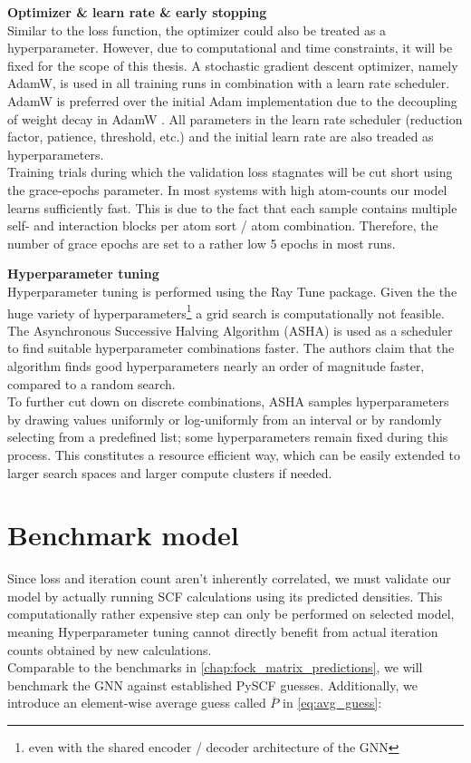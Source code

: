 \textbf{Optimizer \& learn rate \& early stopping}\\
Similar to the loss function, the optimizer could also be treated as a hyperparameter. However, due to computational and time constraints, it will be fixed for the scope of this thesis. A stochastic gradient descent optimizer, namely AdamW, is used in all training runs in combination with a learn rate scheduler. AdamW is preferred over the initial Adam implementation due to the decoupling of weight decay in AdamW \parencite{ref:adamW}. All parameters in the learn rate scheduler (reduction factor, patience, threshold, etc.) and the initial learn rate are also treaded as hyperparameters. \\
Training trials during which the validation loss stagnates will be cut short using the grace-epochs parameter. In most systems with high atom-counts our model learns sufficiently fast. This is due to the fact that each sample contains multiple self- and interaction blocks per atom sort / atom combination. Therefore, the number of grace epochs are set to a rather low 5 epochs in most runs. 

\textbf{Hyperparameter tuning}\\
Hyperparameter tuning is performed using the Ray Tune \parencite{ref:ray_tune} package. Given the the huge variety of hyperparameters\footnote{even with the shared encoder / decoder architecture of the GNN} a grid search is computationally not feasible. The Asynchronous Successive Halving Algorithm (ASHA) is used as a scheduler to find suitable hyperparameter combinations faster. The authors claim that the algorithm finds good hyperparameters nearly an order of magnitude faster, compared to a random search. \parencite{ref:ASHA}\\
To further cut down on discrete combinations, ASHA samples hyperparameters by drawing values uniformly or log-uniformly from an interval or by randomly selecting from a predefined list; some hyperparameters remain fixed during this process. This constitutes a resource efficient way, which can be easily extended to larger search spaces and larger compute clusters if needed. 

\section{Benchmark model}
\label{sec:0_d_benchmark_model}
Since loss and iteration count aren't inherently correlated, we must validate our model by actually running SCF calculations using its predicted densities. This computationally rather expensive step can only be performed on selected model, meaning Hyperparameter tuning cannot directly benefit from actual iteration counts obtained by new calculations.\\
Comparable to the benchmarks in \autoref{chap:fock_matrix_predictions}, we will benchmark the GNN against established PySCF guesses. Additionally, we introduce an element-wise average guess called $\overline{P}$ in \autoref{eq:avg_guess}: 

